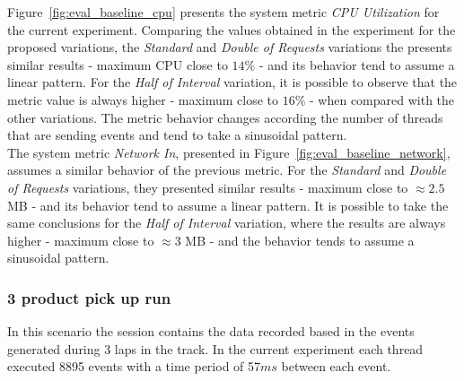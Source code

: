 Figure~\ref{fig:eval_baseline_cpu} presents the system metric \textit{CPU Utilization} for the current
experiment. Comparing the values obtained in the experiment for the proposed variations, the
\textit{Standard} and \textit{Double of Requests} variations the presents similar results -
maximum \gls{CPU} close to $14\%$ - and its behavior tend to assume a linear pattern. For the \textit{Half of Interval}
variation, it is possible to observe that the metric value is always higher - maximum close to $16\%$ -
when compared with the other variations. The metric behavior changes according the number of threads
that are sending events and tend to take a sinusoidal pattern.\\

The system metric \textit{Network In}, presented in Figure~\ref{fig:eval_baseline_network}, assumes a
similar behavior of the previous metric. For the \textit{Standard} and \textit{Double of Requests} variations,
they presented similar results - maximum close to $\approx2.5$ \gls{MB} - and its behavior tend to assume a linear
pattern. It is possible to take the same conclusions for the \textit{Half of Interval} variation,
where the results are always higher - maximum close to $\approx3$ \gls{MB} - and the behavior tends to assume
a sinusoidal pattern.

\subsubsection{3 product pick up run}
\label{subs:eval_exp_data_3laps}
In this scenario the session contains the data recorded based in the events generated during 3 laps
in the track. In the current experiment each thread executed 8895 events with a time period of 57$ms$
between each event.\\

